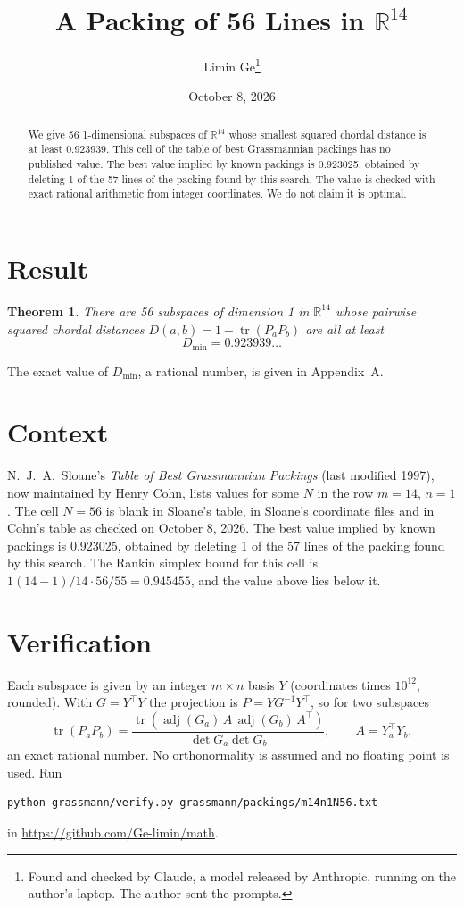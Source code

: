 \documentclass[11pt,a4paper]{article}
\title{A Packing of 56 Lines in $\mathbb{R}^{14}$}
\author{Limin Ge\thanks{Found and checked by Claude, a model released by Anthropic, running on the author's laptop. The author sent the prompts.}}
\date{October 8, 2026}
\newtheorem*{theorem}{Theorem}
\begin{document}
\maketitle
\begin{abstract}
We give 56 1-dimensional subspaces of $\mathbb{R}^{14}$ whose smallest squared chordal distance is at least 0.923939. This cell of the table of best Grassmannian packings has no published value. The best value implied by known packings is 0.923025, obtained by deleting 1 of the 57 lines of the packing found by this search. The value is checked with exact rational arithmetic from integer coordinates. We do not claim it is optimal.
\end{abstract}

\section{Result}
\begin{theorem}
There are 56 subspaces of dimension 1 in $\mathbb{R}^{14}$ whose pairwise squared chordal distances $D(a,b) = 1 - \operatorname{tr}(P_aP_b)$ are all at least
\[ D_{\min} = 0.923939\ldots \]
\end{theorem}
The exact value of $D_{\min}$, a rational number, is given in Appendix~A.


\section{Context}
N.~J.~A.~Sloane's \emph{Table of Best Grassmannian Packings} (last modified 1997), now maintained by Henry Cohn, lists values for some $N$ in the row $m=14$, $n=1$. The cell $N=56$ is blank in Sloane's table, in Sloane's coordinate files and in Cohn's table as checked on October 8, 2026. The best value implied by known packings is 0.923025, obtained by deleting 1 of the 57 lines of the packing found by this search. The Rankin simplex bound for this cell is $1(14-1)/14\cdot 56/55 = 0.945455$, and the value above lies below it.


\section{Verification}
Each subspace is given by an integer $m\times n$ basis $Y$ (coordinates times $10^{12}$, rounded). With $G=Y^\top Y$ the projection is $P=YG^{-1}Y^\top$, so for two subspaces
\[ \operatorname{tr}(P_aP_b)=\frac{\operatorname{tr}(\operatorname{adj}(G_a)\,A\,\operatorname{adj}(G_b)\,A^\top)}{\det G_a\det G_b},\qquad A=Y_a^\top Y_b, \]
an exact rational number. No orthonormality is assumed and no floating point is used. Run
\begin{verbatim}
python grassmann/verify.py grassmann/packings/m14n1N56.txt
\end{verbatim}
in \url{https://github.com/Ge-limin/math}.
\end{document}
